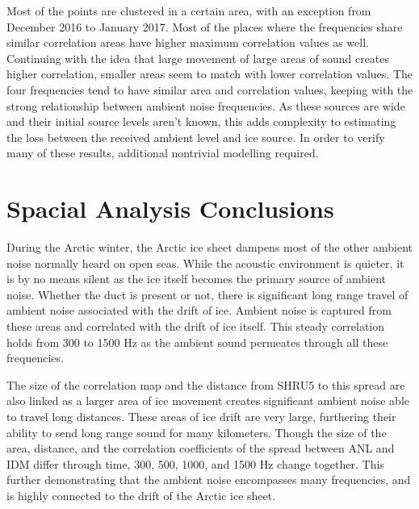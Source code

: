 Most of the points are clustered in a certain area, with an exception from December 2016 to January 2017. Most of the places where the frequencies share similar correlation areas have higher maximum correlation values as well. Continuing with the idea that large movement of large areas of sound creates higher correlation, smaller areas seem to match with lower correlation values. The four frequencies tend to have similar area and correlation values, keeping with the strong relationship between ambient noise frequencies. As these sources are wide and their initial source levels aren't known, this adds complexity to estimating the loss between the received ambient level and ice source. In order to verify many of these results, additional nontrivial modelling required. 







\section{Spacial Analysis Conclusions} %

%
During the Arctic winter, the Arctic ice sheet dampens most of the other ambient noise normally heard on open seas. While the acoustic environment is quieter, it is by no means silent as the ice itself becomes the primary source of ambient noise.  Whether the duct is present or not, there is significant long range travel of ambient noise associated with the drift of ice. Ambient noise is captured from these areas and correlated with the drift of ice itself. This steady correlation holds from 300 to 1500 Hz as the ambient sound permeates through all these frequencies.

The size of the correlation map and the distance from SHRU5 to this spread are also linked as a larger area of ice movement creates significant ambient noise able to travel long distances. These areas of ice drift are very large, furthering their ability to send long range sound for many kilometers. Though the size of the area, distance, and the correlation coefficients of the spread between ANL and IDM differ through time, 300, 500, 1000, and 1500 Hz change together. This further demonstrating that the ambient noise encompasses many frequencies, and is highly connected to the drift of the Arctic ice sheet. 







